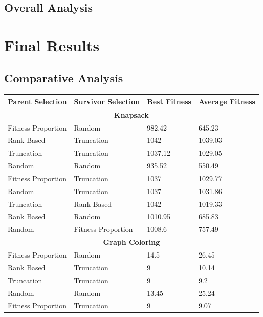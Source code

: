 \documentclass[11pt, letterpaper]{article}
\begin{document}
\subsection {Overall Analysis}

\newpage

\section{Final Results}
\subsection{Comparative Analysis}
\begin{table}[ht]
    \centering
    \begin{tabular}{|l|l|l|l|}
    \hline
        \textbf{Parent Selection} & \textbf{Survivor Selection} & \textbf{Best Fitness} & \textbf{Average Fitness} \\ \hline
        \multicolumn{4}{|c|}{\textbf{Knapsack}} \\ \hline
        Fitness Proportion & Random & 982.42 & 645.23 \\ \hline
        Rank Based & Truncation & 1042 & 1039.03 \\ \hline
        Truncation & Truncation & 1037.12 & 1029.05 \\ \hline
        Random & Random & 935.52 & 550.49 \\ \hline
        Fitness Proportion & Truncation & 1037 & 1029.77 \\ \hline
        Random & Truncation & 1037 & 1031.86 \\ \hline
        Truncation & Rank Based & 1042 & 1019.33 \\ \hline
        Rank Based & Random & 1010.95 & 685.83 \\ \hline
        Random & Fitness Proportion & 1008.6 & 757.49 \\ \hline
        \multicolumn{4}{|c|}{\textbf{Graph Coloring}} \\ \hline
        Fitness Proportion & Random & 14.5 & 26.45 \\ \hline
        Rank Based & Truncation & 9 & 10.14 \\ \hline
        Truncation & Truncation & 9 & 9.2 \\ \hline
        Random & Random & 13.45 & 25.24 \\ \hline
        Fitness Proportion & Truncation & 9 & 9.07 \\ \hline

\end{tabular}
\end{table}
\end{document}
